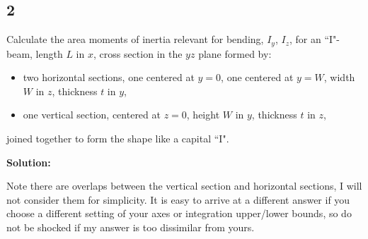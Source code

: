 \documentclass[12pt]{article}
\begin{document}
\subsection{2}
Calculate the area moments of inertia relevant for bending, $I_y$, $I_z$, for an
``I"-beam, length $L$ in $x$, cross section in the $yz$ plane formed by:
\begin{itemize}
	\item two horizontal sections, one centered at $y=0$, one centered at $y=W$, width $W$ in $z$, thickness $t$ in $y$,
	\item one vertical section, centered at $z=0$, height $W$ in $y$, thickness $t$ in $z$,
\end{itemize}
joined together to form the shape like a capital ``I".

\textbf{Solution:}

Note there are overlaps between the vertical section and horizontal sections, I will not consider them
for simplicity. It is easy to arrive at a different answer if you choose a different setting of your axes
or integration upper/lower bounds, so do not be shocked if my answer is too dissimilar from yours.
\end{document}
